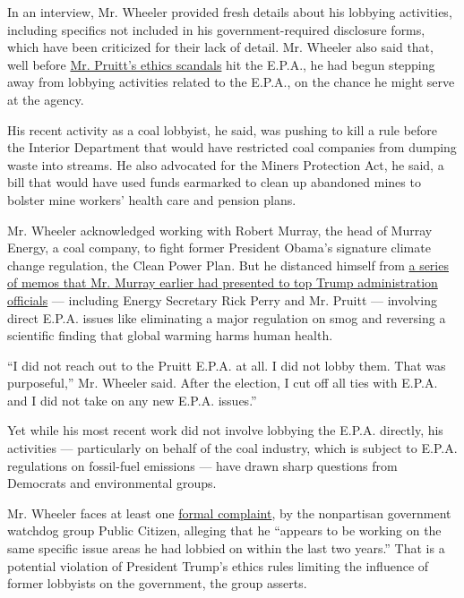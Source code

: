 In an interview, Mr. Wheeler provided fresh details about his lobbying
activities, including specifics not included in his government-required
disclosure forms, which have been criticized for their lack of detail.
Mr. Wheeler also said that, well before
\href{https://www.nytimes.com/2018/04/18/climate/scott-pruitt-epa-investigations-guide.html}{Mr.
Pruitt's ethics scandals} hit the E.P.A., he had begun stepping away
from lobbying activities related to the E.P.A., on the chance he might
serve at the agency.

His recent activity as a coal lobbyist, he said, was pushing to kill a
rule before the Interior Department that would have restricted coal
companies from dumping waste into streams. He also advocated for the
Miners Protection Act, he said, a bill that would have used funds
earmarked to clean up abandoned mines to bolster mine workers' health
care and pension plans.

Mr. Wheeler acknowledged working with Robert Murray, the head of Murray
Energy, a coal company, to fight former President Obama's signature
climate change regulation, the Clean Power Plan. But he distanced
himself from
\href{https://www.nytimes.com/2018/01/09/climate/coal-murray-trump-memo.html}{a
series of memos that Mr. Murray earlier had presented to top Trump
administration officials} --- including Energy Secretary Rick Perry and
Mr. Pruitt --- involving direct E.P.A. issues like eliminating a major
regulation on smog and reversing a scientific finding that global
warming harms human health.

``I did not reach out to the Pruitt E.P.A. at all. I did not lobby them.
That was purposeful,'' Mr. Wheeler said. After the election, I cut off
all ties with E.P.A. and I did not take on any new E.P.A. issues.''

Yet while his most recent work did not involve lobbying the E.P.A.
directly, his activities --- particularly on behalf of the coal
industry, which is subject to E.P.A. regulations on fossil-fuel
emissions --- have drawn sharp questions from Democrats and
environmental groups.

Mr. Wheeler faces at least one
\href{https://www.citizen.org/sites/default/files/30_lobbying_ethics_complaints.pdf}{formal
complaint}, by the nonpartisan government watchdog group Public Citizen,
alleging that he ``appears to be working on the same specific issue
areas he had lobbied on within the last two years.'' That is a potential
violation of President Trump's ethics rules limiting the influence of
former lobbyists on the government, the group asserts.

